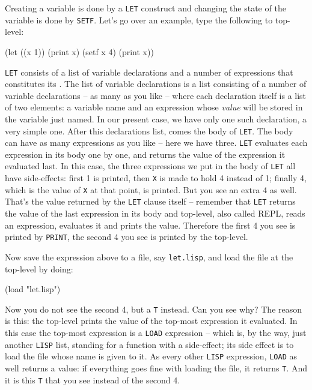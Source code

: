 \documentclass[a4paper,11pt]{article}
\begin{document}
\begin{uenum}
\item
Creating a variable is done by a \Verb+LET+ construct and changing the state of the variable is done by \Verb+SETF+. Let's go over an example, type the following to top-level: 

\begin{lispcode}
(let ((x 1)) (print x) (setf x 4) (print x))
\end{lispcode}

\begin{uenumi}

\item \Verb+LET+ consists of a list of variable declarations and a number of expressions that constitutes its . The list of variable declarations is a list consisting of a number of variable declarations -- as many as you like -- where each declaration itself is a list of two elements: a variable name and an expression whose \emph{value} will be stored in the variable just named. In our present case, we have only one such declaration, a very simple one. After this declarations list, comes the body of \Verb+LET+. The body can have as many expressions as you like -- here we have three. \Verb+LET+ evaluates each expression in its body one by one, and returns the value of the expression it evaluated last. In this case, the three expressions we put in the body of \Verb+LET+ all have side-effects: first 1 is printed, then \Verb+X+ is made to hold 4 instead of 1; finally 4, which is the value of \Verb+X+ at that point, is printed. But you see an extra 4 as well. That's the value returned by the \Verb+LET+ clause itself -- remember that \Verb+LET+ returns the value of the last expression in its body and top-level, also called REPL, reads an expression, evaluates it and prints the value. Therefore the first 4 you see is printed by \Verb+PRINT+, the second 4 you see is printed by the top-level.

\item Now save the expression above to a file, say \Verb+let.lisp+, and load the file at the top-level by doing:

\begin{lispcode}
(load "let.lisp")
\end{lispcode}

Now you do not see the second 4, but a \Verb+T+ instead. Can you see why? The reason is this: the top-level prints the value of the top-most expression it evaluated. In this case the top-most expression is a \Verb+LOAD+ expression -- which is, by the way, just another \Verb+LISP+ list, standing for a function with a side-effect; its side effect is to load the file whose name is given to it. As every other \Verb+LISP+ expression, \Verb+LOAD+ as well returns a value: if everything goes fine with loading the file, it returns \Verb+T+. And it is this \Verb+T+ that you see instead of the second 4.


\end{uenumi}
\end{uenum}
\end{document}
